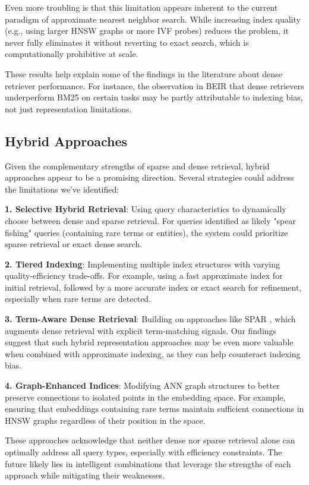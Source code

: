 \documentclass[sigconf,review]{acmart}
\begin{document}
Even more troubling is that this limitation appears inherent to the current paradigm of approximate nearest neighbor search. While increasing index quality (e.g., using larger HNSW graphs or more IVF probes) reduces the problem, it never fully eliminates it without reverting to exact search, which is computationally prohibitive at scale.

These results help explain some of the findings in the literature about dense retriever performance. For instance, the observation in BEIR \cite{thakur2021beir} that dense retrievers underperform BM25 on certain tasks may be partly attributable to indexing bias, not just representation limitations.

\subsection{Hybrid Approaches}
Given the complementary strengths of sparse and dense retrieval, hybrid approaches appear to be a promising direction. Several strategies could address the limitations we've identified:

\textbf{1. Selective Hybrid Retrieval}: Using query characteristics to dynamically choose between dense and sparse retrieval. For queries identified as likely "spear fishing" queries (containing rare terms or entities), the system could prioritize sparse retrieval or exact dense search.

\textbf{2. Tiered Indexing}: Implementing multiple index structures with varying quality-efficiency trade-offs. For example, using a fast approximate index for initial retrieval, followed by a more accurate index or exact search for refinement, especially when rare terms are detected.

\textbf{3. Term-Aware Dense Retrieval}: Building on approaches like SPAR \cite{chen2022salient}, which augments dense retrieval with explicit term-matching signals. Our findings suggest that such hybrid representation approaches may be even more valuable when combined with approximate indexing, as they can help counteract indexing bias.

\textbf{4. Graph-Enhanced Indices}: Modifying ANN graph structures to better preserve connections to isolated points in the embedding space. For example, ensuring that embeddings containing rare terms maintain sufficient connections in HNSW graphs regardless of their position in the space.

These approaches acknowledge that neither dense nor sparse retrieval alone can optimally address all query types, especially with efficiency constraints. The future likely lies in intelligent combinations that leverage the strengths of each approach while mitigating their weaknesses.
\end{document}
